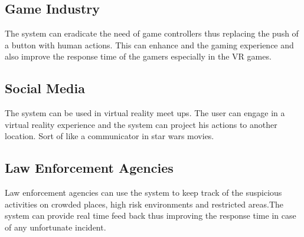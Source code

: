 \documentclass[11pt]{article}
\begin{document}
\subsection{\textbf{Game Industry}}
The system can eradicate the need of game controllers thus replacing the push of a button with human actions. This can enhance and the gaming experience and also improve the response time of the gamers especially in the VR games.  
\subsection{\textbf{Social Media}}
 The system can be used in virtual reality meet ups. The user can engage in a virtual reality experience and the system can project his actions to another location. Sort of like a communicator in star wars movies.
\subsection{\textbf{Law Enforcement Agencies}}
Law enforcement agencies can use the system to keep track of the suspicious activities on crowded places, high risk environments and restricted areas.The system can provide real time feed back thus improving the response time in case of any unfortunate incident. 
\end{document}
